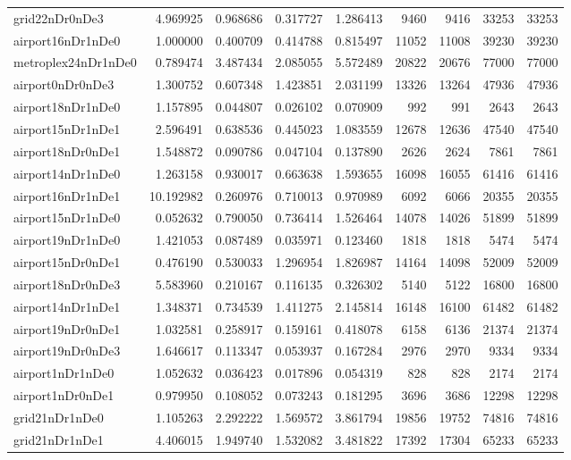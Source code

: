 \begin{longtable}{|l|r|r|r|r|r|r|r|r|}
grid22nDr0nDe3 & 4.969925 & 0.968686 & 0.317727 & 1.286413 & 9460 & 9416 & 33253 & 33253 \\
airport16nDr1nDe0 & 1.000000 & 0.400709 & 0.414788 & 0.815497 & 11052 & 11008 & 39230 & 39230 \\
metroplex24nDr1nDe0 & 0.789474 & 3.487434 & 2.085055 & 5.572489 & 20822 & 20676 & 77000 & 77000 \\
airport0nDr0nDe3 & 1.300752 & 0.607348 & 1.423851 & 2.031199 & 13326 & 13264 & 47936 & 47936 \\
airport18nDr1nDe0 & 1.157895 & 0.044807 & 0.026102 & 0.070909 & 992 & 991 & 2643 & 2643 \\
airport15nDr1nDe1 & 2.596491 & 0.638536 & 0.445023 & 1.083559 & 12678 & 12636 & 47540 & 47540 \\
airport18nDr0nDe1 & 1.548872 & 0.090786 & 0.047104 & 0.137890 & 2626 & 2624 & 7861 & 7861 \\
airport14nDr1nDe0 & 1.263158 & 0.930017 & 0.663638 & 1.593655 & 16098 & 16055 & 61416 & 61416 \\
airport16nDr1nDe1 & 10.192982 & 0.260976 & 0.710013 & 0.970989 & 6092 & 6066 & 20355 & 20355 \\
airport15nDr1nDe0 & 0.052632 & 0.790050 & 0.736414 & 1.526464 & 14078 & 14026 & 51899 & 51899 \\
airport19nDr1nDe0 & 1.421053 & 0.087489 & 0.035971 & 0.123460 & 1818 & 1818 & 5474 & 5474 \\
airport15nDr0nDe1 & 0.476190 & 0.530033 & 1.296954 & 1.826987 & 14164 & 14098 & 52009 & 52009 \\
airport18nDr0nDe3 & 5.583960 & 0.210167 & 0.116135 & 0.326302 & 5140 & 5122 & 16800 & 16800 \\
airport14nDr1nDe1 & 1.348371 & 0.734539 & 1.411275 & 2.145814 & 16148 & 16100 & 61482 & 61482 \\
airport19nDr0nDe1 & 1.032581 & 0.258917 & 0.159161 & 0.418078 & 6158 & 6136 & 21374 & 21374 \\
airport19nDr0nDe3 & 1.646617 & 0.113347 & 0.053937 & 0.167284 & 2976 & 2970 & 9334 & 9334 \\
airport1nDr1nDe0 & 1.052632 & 0.036423 & 0.017896 & 0.054319 & 828 & 828 & 2174 & 2174 \\
airport1nDr0nDe1 & 0.979950 & 0.108052 & 0.073243 & 0.181295 & 3696 & 3686 & 12298 & 12298 \\
grid21nDr1nDe0 & 1.105263 & 2.292222 & 1.569572 & 3.861794 & 19856 & 19752 & 74816 & 74816 \\
grid21nDr1nDe1 & 4.406015 & 1.949740 & 1.532082 & 3.481822 & 17392 & 17304 & 65233 & 65233 \\

\end{longtable}
